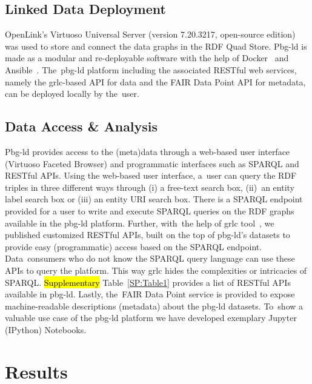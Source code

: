 \documentclass[applsci,article,accept,moreauthors,pdftex]{Definitions/mdpi}
\begin{document}
{\subsection{Linked Data Deployment}
OpenLink’s Virtuoso Universal Server (version 7.20.3217, open-source edition) was used to store and connect the data graphs in the RDF Quad Store. Pbg-ld is made as a modular and re-deployable {software} with the help of Docker~\cite{boettiger2015introduction} and Ansible~\cite{ansible}. The~pbg-ld platform including the associated RESTful web services, namely the grlc-based API for data and the FAIR Data Point API for metadata, can be deployed locally by the~user.

\subsection{Data Access \& Analysis}
Pbg-ld provides access to the (meta)data through a web-based user interface (Virtuoso Faceted Browser) and programmatic interfaces such as SPARQL and RESTful APIs.
Using the web-based user interface, a~user can query the RDF triples in three different ways through (i) a free-text search box, (ii)~an entity label search box or (iii) an entity URI search box. There is a SPARQL endpoint provided for a user to write and execute SPARQL queries on the RDF graphs available in the pbg-ld platform. Further, with~the help of grlc tool~\cite{Merono-Penuela2016}, we published customized RESTful APIs, built on the top of pbg-ld’s datasets to provide easy (programmatic) access based on the SPARQL endpoint. Data~consumers who do not know the SPARQL query language can use these APIs to query the platform. This way grlc hides the complexities or intricacies of SPARQL. \hl{Supplementary} Table~\ref{SP:Table1}  %
provides a list of RESTful APIs available in pbg-ld. Lastly, the~FAIR Data Point service is provided to expose machine-readable descriptions (metadata) about the pbg-ld datasets. To~show a valuable use case of the pbg-ld platform we have developed exemplary Jupyter (IPython) Notebooks. 

\section{Results}
\unskip
}
\end{document}
